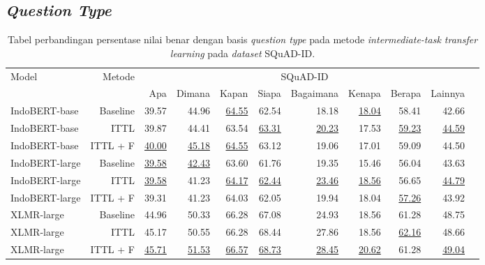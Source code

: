\subsection*{\emph{Question Type}}
\begin{table}[H]\centering
\scriptsize
\begin{tabular}{lrrrrrrrrrr}\toprule
\multirow{2}{*}{Model} &\multirow{2}{*}{Metode} &\multicolumn{8}{c}{SQuAD-ID} \\\cmidrule{3-10}
& &Apa &Dimana &Kapan &Siapa &Bagaimana &Kenapa &Berapa &Lainnya \\\midrule
IndoBERT-base &Baseline &39.57 &44.96 &\underline{64.55} &62.54 &18.18 &\underline{18.04} &58.41 &42.66 \\
IndoBERT-base &ITTL &39.87 &44.41 &63.54 &\underline{63.31} &\underline{20.23} &17.53 &\underline{59.23} &\underline{44.59} \\
IndoBERT-base &ITTL + F &\underline{40.00} &\underline{45.18} &\underline{64.55} &63.12 &19.06 &17.01 &59.09 &44.50 \\
\hline
IndoBERT-large &Baseline &\underline{39.58} &\underline{42.43} &63.60 &61.76 &19.35 &15.46 &56.04 &43.63 \\
IndoBERT-large &ITTL &\underline{39.58} &41.23 &\underline{64.17} &\underline{62.44} &\underline{23.46} &\underline{18.56} &56.65 &\underline{44.79} \\
IndoBERT-large &ITTL + F &39.31 &41.23 &64.03 &62.05 &19.94 &18.04 &\underline{57.26} &43.92 \\
\hline
XLMR-large &Baseline &44.96 &50.33 &66.28 &67.08 &24.93 &18.56 &61.28 &48.75 \\
XLMR-large &ITTL &45.17 &50.55 &66.28 &68.44 &27.86 &18.56 &\underline{62.16} &48.66 \\
XLMR-large &ITTL + F &\underline{45.71} &\underline{51.53} &\underline{66.57} &\underline{68.73} &\underline{28.45} &\underline{20.62} &61.28 &\underline{49.04} \\
\bottomrule
\end{tabular}
\caption{Tabel perbandingan persentase nilai benar dengan basis \emph{question type} pada metode \emph{intermediate-task transfer learning} pada \emph{dataset} SQuAD-ID.}
\end{table}

